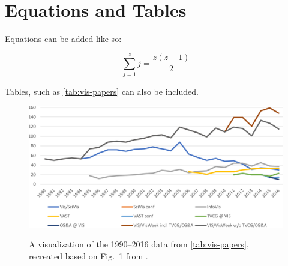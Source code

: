 \section{Equations and Tables}

Equations can be added like so:

\begin{equation}
  \label{eq:sum}
  \sum_{j=1}^{z} j = \frac{z(z+1)}{2}
\end{equation}

Tables, such as \cref{tab:vis-papers} can also be included.



\begin{figure}[tb]%
  \centering %
  \includegraphics[width=\columnwidth, alt={A line graph showing paper counts between 0 and 160 from 1990 to 2016 for 9 venues.}]{./assets/imgs/2-paper-count-2016/paper-count-2016.pdf}
  \caption{%
  	A visualization of the 1990--2016 data from \cref{tab:vis-papers}, recreated based on Fig.\ 1 from \cite{Isenberg2017Vispubdata.orgMetadataCollection}.%
  }
  \label{fig:vis_papers}
\end{figure}
